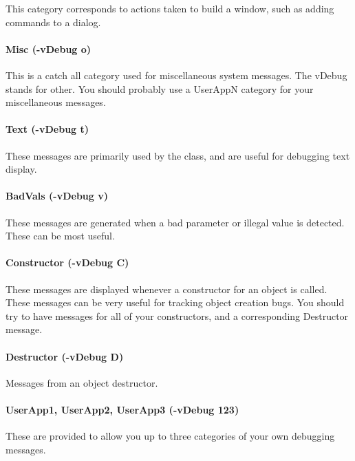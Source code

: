 This category corresponds to actions taken to build a window, such
as adding commands to a dialog.

\paragraph*{Misc (-vDebug o)}

This is a catch all category used for miscellaneous system messages.
The  vDebug stands for other.
You should probably use a UserAppN category for your miscellaneous messages.

\paragraph*{Text (-vDebug t)}

These messages are primarily used by the  class,
and are useful for debugging text display.

\paragraph*{BadVals (-vDebug v)}

These messages are generated when a bad parameter or illegal value
is detected. These can be most useful.

\paragraph*{Constructor (-vDebug C)}

These messages are displayed whenever a constructor for an
object is called. These messages can be very useful for tracking
object creation bugs. You should try to have
 messages
for all of your constructors, and a corresponding Destructor message.

\paragraph*{Destructor (-vDebug D)}

Messages from an object destructor.

\paragraph*{UserApp1, UserApp2, UserApp3 (-vDebug 123)}

These are provided to allow you up to three categories of your
own debugging messages.

